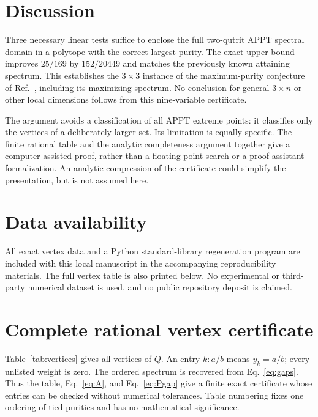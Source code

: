 \documentclass[aps,pra,onecolumn,notitlepage,10pt,amsmath,amssymb,longbibliography,nofootinbib]{revtex4-2}
\begin{document}
\section{Discussion}

Three necessary linear tests suffice to enclose the full two-qutrit APPT
spectral domain in a polytope with the correct largest purity. The exact
upper bound improves $25/169$ by $152/20449$ and matches the previously known
attaining spectrum. This establishes the $3\times3$ instance of the
maximum-purity conjecture of Ref.~\cite{AhiableKothakondaWinter}, including
its maximizing spectrum. No conclusion for general $3\times n$ or other
local dimensions follows from this nine-variable certificate.

The argument avoids a classification of all APPT extreme points: it classifies
only the vertices of a deliberately larger set. Its limitation is equally
specific. The finite rational table and the analytic completeness argument
together give a computer-assisted proof, rather than a floating-point search
or a proof-assistant formalization. An analytic compression of the certificate
could simplify the presentation, but is not assumed here.

\section*{Data availability}
All exact vertex data and a Python standard-library regeneration program are
included with this local manuscript in the accompanying reproducibility
materials. The full vertex table is also printed below. No experimental or
third-party numerical dataset is used, and no public repository deposit is
claimed.

\appendix
\section{Complete rational vertex certificate}
\label{app:vertices}

Table~\ref{tab:vertices} gives all vertices of $Q$. An entry $k:a/b$ means
$y_k=a/b$; every unlisted weight is zero. The ordered spectrum is recovered
from Eq.~\eqref{eq:gaps}. Thus the table, Eq.~\eqref{eq:A}, and
Eq.~\eqref{eq:Pgap} give a finite exact certificate whose entries can be checked
without numerical tolerances. Table numbering fixes one ordering of tied
purities and has no mathematical significance.



\nocite{*}

\raggedright

\end{document}
